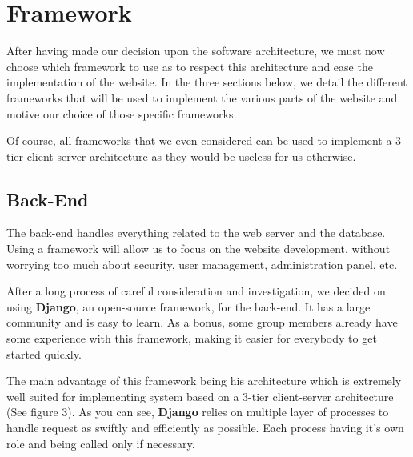 \section{Framework}

After having made our decision upon the software architecture, we must now
choose which framework to use as to respect this architecture and ease the
implementation of the website. In the three sections below, we detail the
different frameworks that will be used to implement the various parts of
the website and motive our choice of those specific frameworks. \newline

Of course, all frameworks that we even considered can be used to implement
a 3-tier client-server architecture as they would be useless for us
otherwise.

\subsection{Back-End}

The back-end handles everything related to the web server and the database.
Using a framework will allow us to focus on the website development,
without worrying too much about security, user management, administration
panel, etc.\newline

After a long process of careful consideration and investigation, we decided
on using \textbf{Django}, an open-source framework, for the back-end. It
has a large community and is easy to learn. As a bonus, some group members
already have some experience with this framework, making it easier for
everybody to get started quickly.\newline

The main advantage of this framework being his architecture which is
extremely well suited for implementing system based on a 3-tier
client-server architecture (See figure 3). As you can see, \textbf{Django}
relies on multiple layer of processes to handle request as swiftly and
efficiently as possible. Each process having it's own role and being called
only if necessary.  \newline

